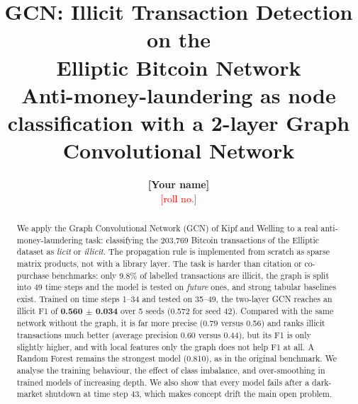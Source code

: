 \documentclass[11pt,a4paper]{article}
\title{\vspace{-1.2cm}\textbf{GCN: Illicit Transaction Detection on the\\ Elliptic Bitcoin Network}\\[4pt]
\large Anti-money-laundering as node classification with a 2-layer Graph Convolutional Network}
\author{\textbf{[Your name]} \\ \textcolor{red}{[roll no.]}}
\date{}
\begin{document}
\maketitle
\thispagestyle{fancy}

\begin{abstract}
\noindent We apply the Graph Convolutional Network (GCN) of Kipf and Welling \cite{kipf} to a real anti-money-laundering task:
classifying the 203,769 Bitcoin transactions of the Elliptic dataset \cite{weber} as \emph{licit} or \emph{illicit}. The propagation
rule is implemented from scratch as sparse matrix products, not with a library layer. The task is harder than citation or co-purchase
benchmarks: only 9.8\% of labelled transactions are illicit, the graph is split into 49 time steps and the model is tested on
\emph{future} ones, and strong tabular baselines exist. Trained on time steps 1--34 and tested on 35--49, the two-layer GCN reaches an
illicit F1 of \textbf{0.560 $\pm$ 0.034} over 5 seeds (0.572 for seed 42). Compared with the same network without the graph, it is far
more precise (0.79 versus 0.56) and ranks illicit transactions much better (average precision 0.60 versus 0.44), but its F1 is only
slightly higher, and with local features only the graph does not help F1 at all. A Random Forest remains the strongest model (0.810), as in the
original benchmark. We analyse the training behaviour, the effect of class imbalance, and over-smoothing in trained models of increasing
depth. We also show that every model fails after a dark-market shutdown at time step 43, which makes concept drift the main open problem.
\end{abstract}

\end{document}
